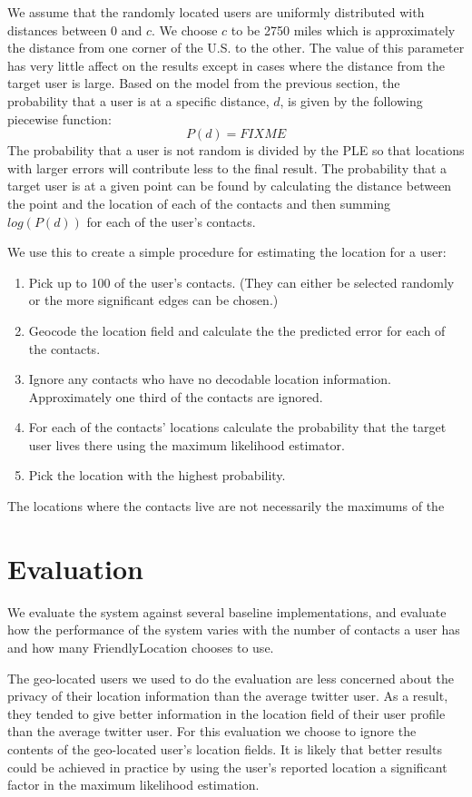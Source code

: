 We assume that the randomly located users are uniformly distributed with
distances between 0 and \(c\). We choose \(c\) to be 2750 miles which is
approximately the distance from one corner of the U.S. to the other. The value
of this parameter has very little affect on the results except in cases where
the distance from the target user is large.
Based on the model from the previous section, the probability that a user is at
a specific distance, \(d\), is given by the following piecewise function:
\begin{displaymath}
    P(d) = FIXME
\end{displaymath}
The probability that a user is not random is divided by the PLE so that
locations with larger errors will contribute less to the final result.
The probability that a target user is at a given point can be found by
calculating the distance between the point and the location of each of the
contacts and then summing \(log(P(d))\) for each of the user's contacts.

We use this to create a simple procedure for estimating the location for a user:
\begin{enumerate}
\item Pick up to 100 of the user's contacts. (They can either be selected
randomly or the more significant edges can be chosen.)
\item Geocode the location field and calculate the the predicted error for each
of the contacts.
\item Ignore any contacts who have no decodable location information.
Approximately one third of the contacts are ignored.
\item For each of the contacts' locations calculate the probability that the
target user lives there using the maximum likelihood estimator.
\item Pick the location with the highest probability.
\end{enumerate}
The locations where the contacts live are not necessarily the maximums of the 

\section{Evaluation}
We evaluate the system against several baseline implementations, and evaluate
how the performance of the system varies with the number of contacts a user has
and how many FriendlyLocation chooses to use.

The geo-located users we used to do the evaluation are less concerned about the
privacy of their location information than the average twitter user.
As a result, they tended to give better information in the location field of
their user profile than the average twitter user.
For this evaluation we choose to ignore the contents of the geo-located user's
location fields.
It is likely that better results could be achieved in practice
by using the user's reported location a significant factor in the maximum
likelihood estimation.

